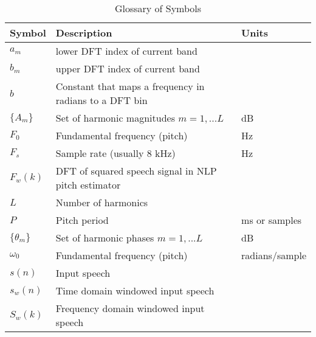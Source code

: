\documentclass{article}
\begin{document}
\begin{table}[H]
\label{tab:symbol_glossary}
\centering
\begin{tabular}{l l l }
\hline
Symbol & Description & Units \\
\hline
$a_m$ & lower DFT index of current band \\
$b_m$ & upper DFT index of current band \\
$b$ & Constant that maps a frequency in radians to a DFT bin \\
$\{A_m\}$ & Set of harmonic magnitudes $m=1,...L$ & dB \\
$F_0$ & Fundamental frequency (pitch) & Hz \\
$F_s$ & Sample rate (usually 8 kHz) & Hz \\
$F_w(k)$ & DFT of squared speech signal in NLP pitch estimator \\
$L$ & Number of harmonics \\
$P$ & Pitch period & ms or samples \\
$\{\theta_m\}$ & Set of harmonic phases $m=1,...L$ & dB \\
$\omega_0$ & Fundamental frequency (pitch) & radians/sample \\
$s(n)$ & Input speech \\
$s_w(n)$ & Time domain windowed input speech \\
$S_w(k)$ & Frequency domain windowed input speech \\
\hline
\end{tabular}
\caption{Glossary of Symbols}
\end{table}



\end{document}
